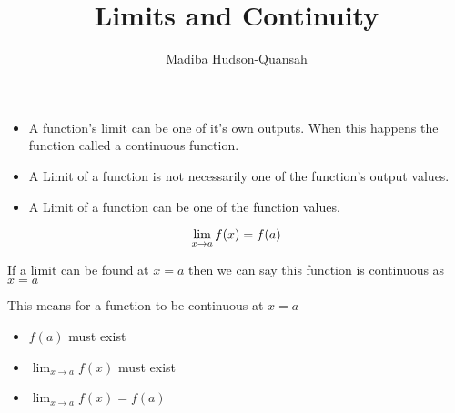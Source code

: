 \documentclass[12pt letter]{report}
\title{\Huge{Limits and Continuity}}
\author{\huge{Madiba Hudson-Quansah}}
\date{}
\begin{document}
\maketitle
\newpage
{}
\tableofcontents
\pagebreak

\chapter{}

\begin{itemize}
	\item A function's limit can be one of it's own outputs. When this happens the function called a continuous function.

	\item A Limit of a function is not necessarily one of the function's output values.

	\item A Limit of a function can be one of the function values.

\end{itemize}

\[
	\lim_{x\to a} f(x) = f(a) \\
\]

If a limit can be found at $x = a$ then we can say this function is continuous as $x = a$

This means for a function to be continuous at $x = a$

\begin{itemize}
	\item $f(a)$ must exist
	\item $\lim_{x \to a} f(x)$ must exist
	\item $\lim_{x\to a} f(x) = f(a)$
\end{itemize}

\end{document}
